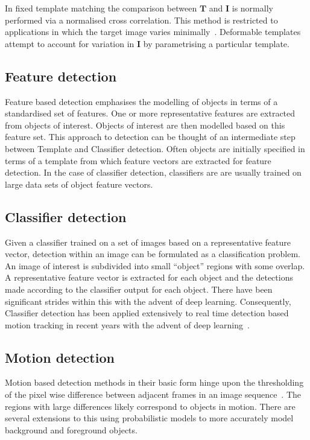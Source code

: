 In fixed template matching the comparison between $\mathbf{T}$ and $\mathbf{I}$ is normally
performed via a normalised cross correlation. This method is restricted to
applications in which the target image varies minimally~\cite{Shantaiya2013}.
Deformable templates attempt to account for variation in $\mathbf{I}$ by
parametrising a particular template.

\subsection{Feature detection}
Feature based detection emphasises the modelling of objects in terms of a
standardised set of features. One or more representative features are extracted
from objects of interest. Objects of interest are then modelled based on this
feature set.
This approach to detection can be thought of an intermediate step between
Template and Classifier detection. Often objects are initially specified in
terms of a template from which feature vectors are extracted for feature
detection. In the case of classifier detection, classifiers are are usually
trained on large data sets of object feature vectors.

\subsection{Classifier detection}
Given a classifier trained on a set of images based on a representative feature
vector, detection within an image can be formulated as a classification problem.
An image of interest is subdivided into small ``object'' regions with some
overlap. A representative feature vector is extracted for each object and the
detections made according to the classifier output for each object. There have
been significant strides within this with the advent of deep learning.
Consequently, Classifier detection has been applied extensively to real time detection
based motion tracking in recent years with the advent of deep
learning~\cite{goturn}.

\subsection{Motion detection}
Motion based detection methods in their basic form hinge upon the thresholding
of the pixel wise difference between adjacent frames in an image
sequence~\cite{Shantaiya2013}. The regions with large differences likely
correspond to objects in motion. There are several extensions to this using
probabilistic models to more accurately model background and foreground objects.

